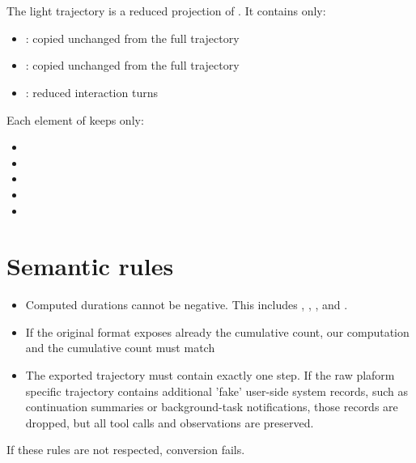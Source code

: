 \documentclass[11pt]{article}
\begin{document}
\section*{\texorpdfstring{}{atif_trajectory_light.json}}

The light trajectory is a reduced projection of .
It contains only:

\begin{itemize}
\item {}: copied unchanged from the full trajectory
\item {}: copied unchanged from the full trajectory
\item {}: reduced interaction turns
\end{itemize}
Each element of  keeps only:
\begin{itemize}
\item {}
\item {}
\item {}
\item {}
\item {}
\end{itemize}

\section*{Semantic rules}
\begin{itemize}
  \item Computed durations cannot be negative. This includes , , , and .
  \item If the original format exposes already the cumulative count, our computation and the cumulative count must match
  \item The exported trajectory must contain exactly one  step. 
  If the raw plaform specific trajectory contains additional 'fake' user-side system records, such as continuation summaries or background-task notifications, those records are dropped, but all  tool calls and observations are preserved.
\end{itemize}
If these rules are not respected, conversion fails.
\end{document}

